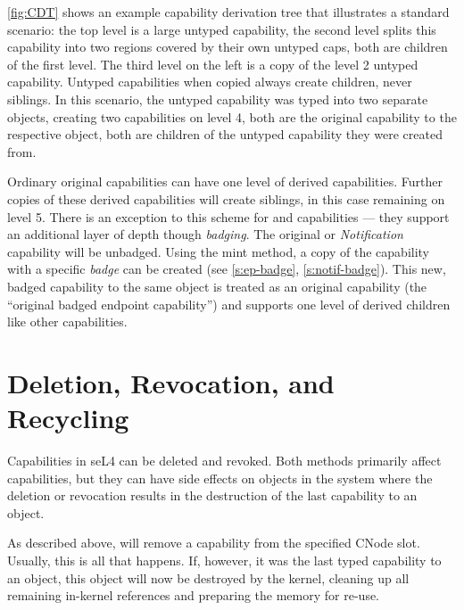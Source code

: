 \autoref{fig:CDT} shows an example capability derivation tree that
illustrates a standard scenario: the top level is a large untyped
capability, the second level splits this capability into two regions
covered by their own untyped caps, both are children of the first
level.  The third level on the left is a copy of the level 2 untyped
capability.  Untyped capabilities when copied always create children,
never siblings.  In this scenario, the untyped capability was typed
into two separate objects, creating two capabilities on level 4, both
are the original capability to the respective object, both are
children of the untyped capability they were created from.

Ordinary original capabilities can have one level of derived
capabilities.  Further copies of these derived capabilities will
create siblings, in this case remaining on level 5. There is an
exception to this scheme for  and  capabilities --- they support an
additional layer of depth though \emph{badging}.
The original  or \emph{Notification} capability will be unbadged. Using
the mint method, a copy of the capability with a specific \emph{badge} can be
created (see \autoref{s:ep-badge}, \autoref{s:notif-badge}). This new, badged capability to the same object is treated as
an original capability (the ``original badged endpoint capability'')
and supports one level of derived children like other capabilities.


\section{Deletion, Revocation, and Recycling}
\label{s:cspace-revoke}

Capabilities in seL4 can be deleted and revoked. Both methods
primarily affect capabilities, but they can have side effects on
objects in the system where the deletion or revocation results in the
destruction of the last capability to an object.

As described above,  will
remove a capability from the specified CNode slot. Usually, this is
all that happens. If, however, it was the last typed capability to an
object, this object will now be destroyed by the kernel, cleaning up
all remaining in-kernel references and preparing the memory for
re-use.

